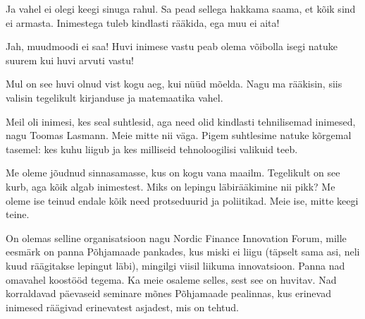 Ja vahel ei olegi keegi sinuga rahul. Sa pead sellega 
hakkama saama, et kõik sind ei armasta. Inimestega tuleb kindlasti rääkida, ega muu ei aita!


Jah, muudmoodi ei saa! Huvi inimese vastu peab olema 
võibolla isegi natuke suurem kui huvi arvuti vastu! 


Mul on see huvi olnud vist kogu aeg, kui nüüd mõelda. Nagu ma rääkisin, siis valisin tegelikult kirjanduse ja 
matemaatika vahel. 


Meil oli inimesi, kes seal suhtlesid, aga need olid kindlasti tehnilisemad inimesed,
nagu Toomas Lasmann. Meie mitte nii väga. Pigem suhtlesime natuke 
kõrgemal tasemel: kes kuhu liigub ja kes milliseid tehnoloogilisi valikuid teeb.


Me oleme jõudnud sinnasamasse, kus on kogu vana maailm. Tegelikult on 
see kurb, aga kõik algab inimestest. Miks on lepingu 
läbirääkimine nii pikk? Me oleme ise teinud endale kõik need protseduurid ja 
poliitikad. Meie ise, mitte keegi teine. 

On olemas selline organisatsioon nagu Nordic Finance Innovation Forum, mille eesmärk 
on panna Põhjamaade pankades, kus miski ei liigu (täpselt sama asi, neli 
kuud räägitakse lepingut läbi), mingilgi viisil liikuma innovatsioon. Panna nad 
omavahel koostööd tegema. Ka meie osaleme selles, sest see on huvitav. Nad korraldavad 
päevaseid seminare mõnes Põhjamaade pealinnas, kus 
erinevad inimesed räägivad erinevatest asjadest, mis on tehtud. 

